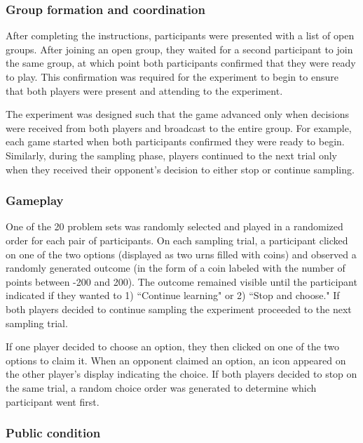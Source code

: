 \documentclass[11pt,jou]{apa6}
\begin{document}
\subsubsection{Group formation and coordination}

After completing the instructions, participants were presented with a list of open groups.
After joining an open group, they waited for a second participant to join the same group, at which point both participants confirmed that they were ready to play.
This confirmation was required for the experiment to begin to ensure that both players were present and attending to the experiment.

The experiment was designed such that the game advanced only when decisions were received from both players and broadcast to the entire group. 
For example, each game started when both participants confirmed they were ready to begin.
Similarly, during the sampling phase, players continued to the next trial only when they received their opponent's decision to either stop or continue sampling.

\subsubsection{Gameplay}

One of the 20 problem sets was randomly selected and played in a randomized order for each pair of participants.
On each sampling trial, a participant clicked on one of the two options (displayed as two urns filled with coins) and observed a randomly generated outcome (in the form of a coin labeled with the number of points between -200 and 200). 
The outcome remained visible until the participant indicated if they wanted to 1) ``Continue learning" or 2) ``Stop and choose." 
If both players decided to continue sampling the experiment proceeded to the next sampling trial.

If one player decided to choose an option, they then clicked on one of the two options to claim it. 
When an opponent claimed an option, an icon appeared on the other player's display indicating the choice. 
If both players decided to stop on the same trial, a random choice order was generated to determine which participant went first.

\subsubsection{Public condition}
\end{document}

